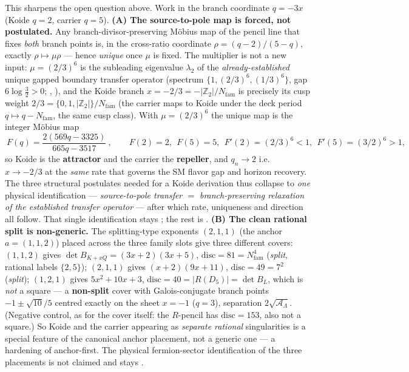 \documentclass[11pt,a4paper]{article}
\newcommand{\Nfam}{N_{\mathrm{fam}}}
\newcommand{\AL}{\mathcal A_\Lambda}
\newcommand{\Z}{\mathbb{Z}}
\theoremstyle{definition}
\begin{document}
\begin{keybox}
This sharpens the open question above. Work in the branch coordinate $q=-3x$ (Koide $q=2$, carrier $q=5$).
\textbf{(A) The source-to-pole map is forced, not postulated.} Any branch-divisor-preserving M\"obius map of the
pencil line that fixes \emph{both} branch points is, in the cross-ratio coordinate $\rho=(q-2)/(5-q)$, exactly
$\rho\mapsto\mu\rho$ --- hence \emph{unique} once $\mu$ is fixed. The multiplier is not a new input: $\mu=(2/3)^6$
is the subleading eigenvalue $\lambda_2$ of the \emph{already-established} unique gapped boundary transfer operator
(spectrum $\{1,(2/3)^6,(1/3)^6\}$, gap $6\log\tfrac32>0$; , ),
and the Koide branch $x=-2/3=-|\Z_2|/\Nfam$ is precisely its cusp weight $2/3=\{0,1,|\Z_2|\}/\Nfam$ (the carrier maps to
Koide under the deck period $q\mapsto q-\Nfam$, the same cusp class). With $\mu=(2/3)^6$ the unique map is the integer
M\"obius map
\[
  \boxed{\ F(q)=\frac{2(569q-3325)}{665q-3517}\ },\qquad F(2)=2,\ \ F(5)=5,\ \ F'(2)=(2/3)^6<1,\ \ F'(5)=(3/2)^6>1,
\]
so Koide is the \textbf{attractor} and the carrier the \textbf{repeller}, and $q_n\to2$ i.e.\ $x\to-2/3$ at the
\emph{same} rate that governs the SM flavor gap and horizon recovery. The three structural postulates needed for a
Koide derivation thus collapse to \emph{one} physical identification --- \emph{source-to-pole transfer $=$
branch-preserving relaxation of the established transfer operator} --- after which rate, uniqueness and direction
all follow. That single identification stays \mC; the rest is \mE. \textbf{(B) The clean rational split is
non-generic.} The splitting-type exponents $(2,1,1)$ (the anchor $a=(1,1,2)$) placed across the three family slots
give three different covers: $(1,1,2)$ gives $\det B_{K+xQ}=(3x+2)(3x+5)$, $\mathrm{disc}=81=\Nfam^4$ (\emph{split},
rational labels $\{2,5\}$); $(2,1,1)$ gives $(x+2)(9x+11)$, $\mathrm{disc}=49=7^2$ (\emph{split}); $(1,2,1)$ gives
$5x^2+10x+3$, $\mathrm{disc}=40=|R(D_5)|=\det B_L$, which is \emph{not} a square --- a \textbf{non-split} cover with
Galois-conjugate branch points $-1\pm\sqrt{10}/5$ centred exactly on the sheet $x=-1$ ($q=3$), separation
$2\sqrt{\AL}$. (Negative control, as for the cover itself: the $R$-pencil has $\mathrm{disc}=153$, also not a
square.) So Koide and the carrier appearing as \emph{separate rational} singularities is a special feature of the
canonical anchor placement, not a generic one --- a hardening of anchor-first. The physical fermion-sector
identification of the three placements is not claimed and stays \mC.
\end{keybox}
\end{document}

